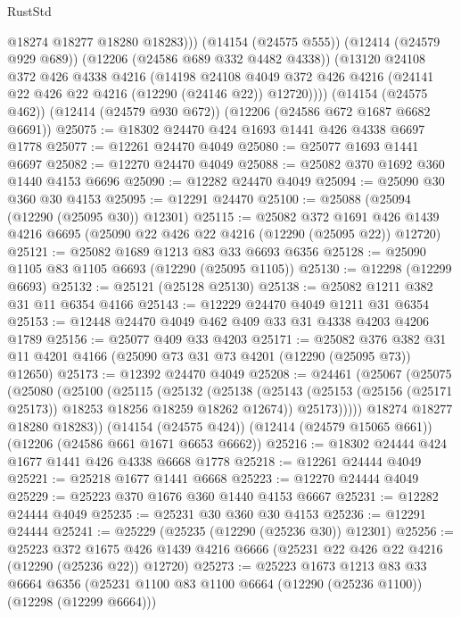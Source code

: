 \begin{lexlean}{RustStd}
\begin{coremodule}
{\begin{coremodule}
{{{{{{{{{{{{{{{{{{{{{{{{{{{{{{{{{{{{{{{{{{{{{{{{{{            @18274
            @18277
            @18280
            @18283)))
      (@14154 (@24575 @555))
      (@12414 (@24579 @929 @689))
      (@12206 (@24586 @689 @332 @4482 @4338))
      (@13120
        @24108
        @372
        @426
        @4338
        @4216
        (@14198
          @24108
          @4049
          @372
          @426
          @4216
          (@24141 @22 @426 @22 @4216 (@12290 (@24146 @22)) @12720))))
    (@14154 (@24575 @462))
    (@12414 (@24579 @930 @672))
    (@12206 (@24586 @672 @1687 @6682 @6691))
@25075 := @18302 @24470 @424 @1693 @1441 @426 @4338 @6697 @1778
@25077 := @12261 @24470 @4049
@25080 := @25077 @1693 @1441 @6697
@25082 := @12270 @24470 @4049
@25088 := @25082 @370 @1692 @360 @1440 @4153 @6696
@25090 := @12282 @24470 @4049
@25094 := @25090 @30 @360 @30 @4153
@25095 := @12291 @24470
@25100 := @25088 (@25094 (@12290 (@25095 @30)) @12301)
@25115 := @25082
    @372
    @1691
    @426
    @1439
    @4216
    @6695
    (@25090 @22 @426 @22 @4216 (@12290 (@25095 @22)) @12720)
@25121 := @25082 @1689 @1213 @83 @33 @6693 @6356
@25128 := @25090 @1105 @83 @1105 @6693 (@12290 (@25095 @1105))
@25130 := @12298 (@12299 @6693)
@25132 := @25121 (@25128 @25130)
@25138 := @25082 @1211 @382 @31 @11 @6354 @4166
@25143 := @12229 @24470 @4049 @1211 @31 @6354
@25153 := @12448 @24470 @4049 @462 @409 @33 @31 @4338 @4203 @4206 @1789
@25156 := @25077 @409 @33 @4203
@25171 := @25082
    @376
    @382
    @31
    @11
    @4201
    @4166
    (@25090 @73 @31 @73 @4201 (@12290 (@25095 @73)) @12650)
@25173 := @12392 @24470 @4049
@25208 := @24461
    (@25067
      (@25075
        (@25080
          (@25100
            (@25115
              (@25132
                (@25138
                  (@25143 (@25153 (@25156 (@25171 @25173)) @18253 @18256 @18259 @18262 @12674))
                  @25173)))))
        @18274
        @18277
        @18280
        @18283))
    (@14154 (@24575 @424))
    (@12414 (@24579 @15065 @661))
    (@12206 (@24586 @661 @1671 @6653 @6662))
@25216 := @18302 @24444 @424 @1677 @1441 @426 @4338 @6668 @1778
@25218 := @12261 @24444 @4049
@25221 := @25218 @1677 @1441 @6668
@25223 := @12270 @24444 @4049
@25229 := @25223 @370 @1676 @360 @1440 @4153 @6667
@25231 := @12282 @24444 @4049
@25235 := @25231 @30 @360 @30 @4153
@25236 := @12291 @24444
@25241 := @25229 (@25235 (@12290 (@25236 @30)) @12301)
@25256 := @25223
    @372
    @1675
    @426
    @1439
    @4216
    @6666
    (@25231 @22 @426 @22 @4216 (@12290 (@25236 @22)) @12720)
@25273 := @25223
    @1673
    @1213
    @83
    @33
    @6664
    @6356
    (@25231 @1100 @83 @1100 @6664 (@12290 (@25236 @1100)) (@12298 (@12299 @6664)))
}}}}}}}}}}}}}}}}}}}}}}}}}}}}}}}}}}}}}}}}}}}}}}}}}}
\end{coremodule}}
\end{coremodule}
\end{lexlean}
